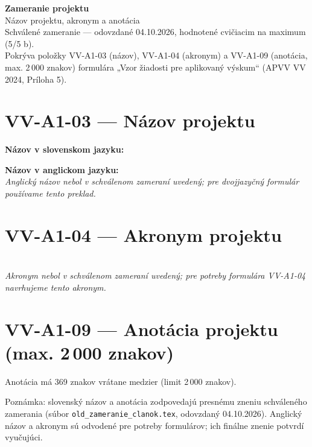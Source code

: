 \documentclass[11pt,a4paper]{article}
\begin{document}
\begin{center}
{\Large\bfseries Zameranie projektu}\\[0.4em]
{\large Názov projektu, akronym a anotácia}\\[0.8em]
{\small Schválené zameranie — odovzdané 04.10.2026, hodnotené cvičiacim na maximum (5/5 b).}\\
{\small Pokrýva položky VV-A1-03 (názov), VV-A1-04 (akronym) a VV-A1-09 (anotácia, max. 2\,000 znakov) formulára „Vzor žiadosti pre aplikovaný výskum“ (APVV VV 2024, Príloha 5).}
\end{center}

\vspace{0.8em}

\section*{VV-A1-03 — Názov projektu}
\textbf{Názov v slovenskom jazyku:} \projectTitleSK

\textbf{Názov v anglickom jazyku:} \projectTitleEN\\
{\small\emph{Anglický názov nebol v schválenom zameraní uvedený; pre dvojjazyčný formulár používame tento preklad.}}

\section*{VV-A1-04 — Akronym projektu}
\projectAcronym\\
{\small\emph{Akronym nebol v schválenom zameraní uvedený; pre potreby formulára VV-A1-04 navrhujeme tento akronym.}}

\section*{VV-A1-09 — Anotácia projektu (max. 2\,000 znakov)}
\projectAnnotation

\vspace{0.6em}
Anotácia má 369 znakov vrátane medzier (limit 2\,000 znakov).

\vspace{1.5em}
{\footnotesize Poznámka: slovenský názov a anotácia zodpovedajú presnému zneniu schváleného zamerania (súbor \nolinkurl{old_zameranie_clanok.tex}, odovzdaný 04.10.2026). Anglický názov a akronym sú odvodené pre potreby formulárov; ich finálne znenie potvrdí vyučujúci.}
\end{document}
